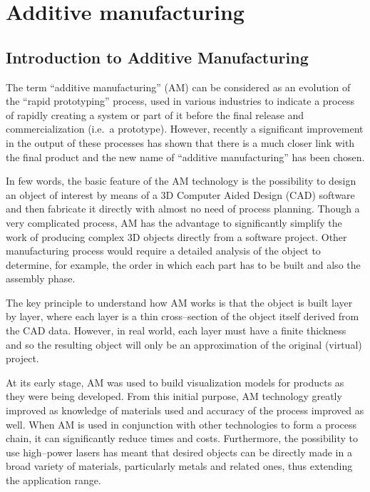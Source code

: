 
\chapter{Additive manufacturing}

\section{Introduction to Additive Manufacturing}
The term ``additive manufacturing'' (AM) can be considered as an evolution of the ``rapid prototyping'' process, used in various industries to indicate a process of rapidly creating a system or part of it before the final release and commercialization (i.e.\ a prototype). However, recently a significant improvement in the output of these processes has shown that there is a much closer link with the final product and the new name of ``additive manufacturing'' has been chosen.

In few words, the basic feature of the AM technology is the possibility to design an object of interest by means of a 3D Computer Aided Design (CAD) software and then fabricate it directly with almost no need of process planning. Though a very complicated process, AM has the advantage to significantly simplify the work of producing complex 3D objects directly from a software project. Other manufacturing process would require a detailed analysis of the object to determine, for example, the order in which each part has to be built and also the assembly phase.

The key principle to understand how AM works is that the object is built layer by layer, where each layer is a thin cross--section of the object itself derived from the CAD data. However, in real world, each layer must have a finite thickness and so the resulting object will only be an approximation of the original (virtual) project.

At its early stage, AM was used to build visualization models for products as they were being developed. From this initial purpose, AM technology greatly improved as knowledge of materials used and accuracy of the process improved as well. When AM is used in conjunction with other technologies to form a process chain, it can significantly reduce times and costs. Furthermore, the possibility to use high--power lasers has meant that desired objects can be directly made in a broad variety of materials, particularly metals and related ones, thus extending the application range.

